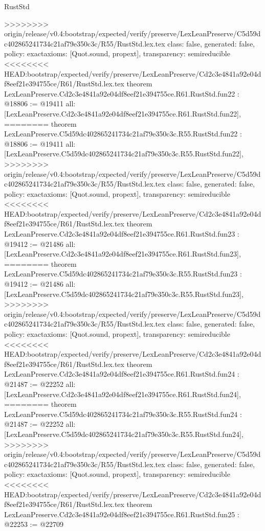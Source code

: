 \begin{lexlean}{RustStd}
\begin{coremodule}
{\begin{coremodule}
{{{{{{{{{{{{{{{{{{{{{{{{{>>>>>>>> origin/release/v0.4:bootstrap/expected/verify/preserve/LexLeanPreserve/C5d59dc402865241734c21af79e350c3c/R55/RustStd.lex.tex
  class: false,
  generated: false,
  policy: exact{axioms: [Quot.sound, propext]},
  transparency: semireducible
}
<<<<<<<< HEAD:bootstrap/expected/verify/preserve/LexLeanPreserve/Cd2c3e4841a92e04df8eef21e394755ce/R61/RustStd.lex.tex
theorem LexLeanPreserve.Cd2c3e4841a92e04df8eef21e394755ce.R61.RustStd.fun22 : @18806 := @19411 {
  all: [LexLeanPreserve.Cd2c3e4841a92e04df8eef21e394755ce.R61.RustStd.fun22],
========
theorem LexLeanPreserve.C5d59dc402865241734c21af79e350c3c.R55.RustStd.fun22 : @18806 := @19411 {
  all: [LexLeanPreserve.C5d59dc402865241734c21af79e350c3c.R55.RustStd.fun22],
>>>>>>>> origin/release/v0.4:bootstrap/expected/verify/preserve/LexLeanPreserve/C5d59dc402865241734c21af79e350c3c/R55/RustStd.lex.tex
  class: false,
  generated: false,
  policy: exact{axioms: [Quot.sound, propext]},
  transparency: semireducible
}
<<<<<<<< HEAD:bootstrap/expected/verify/preserve/LexLeanPreserve/Cd2c3e4841a92e04df8eef21e394755ce/R61/RustStd.lex.tex
theorem LexLeanPreserve.Cd2c3e4841a92e04df8eef21e394755ce.R61.RustStd.fun23 : @19412 := @21486 {
  all: [LexLeanPreserve.Cd2c3e4841a92e04df8eef21e394755ce.R61.RustStd.fun23],
========
theorem LexLeanPreserve.C5d59dc402865241734c21af79e350c3c.R55.RustStd.fun23 : @19412 := @21486 {
  all: [LexLeanPreserve.C5d59dc402865241734c21af79e350c3c.R55.RustStd.fun23],
>>>>>>>> origin/release/v0.4:bootstrap/expected/verify/preserve/LexLeanPreserve/C5d59dc402865241734c21af79e350c3c/R55/RustStd.lex.tex
  class: false,
  generated: false,
  policy: exact{axioms: [Quot.sound, propext]},
  transparency: semireducible
}
<<<<<<<< HEAD:bootstrap/expected/verify/preserve/LexLeanPreserve/Cd2c3e4841a92e04df8eef21e394755ce/R61/RustStd.lex.tex
theorem LexLeanPreserve.Cd2c3e4841a92e04df8eef21e394755ce.R61.RustStd.fun24 : @21487 := @22252 {
  all: [LexLeanPreserve.Cd2c3e4841a92e04df8eef21e394755ce.R61.RustStd.fun24],
========
theorem LexLeanPreserve.C5d59dc402865241734c21af79e350c3c.R55.RustStd.fun24 : @21487 := @22252 {
  all: [LexLeanPreserve.C5d59dc402865241734c21af79e350c3c.R55.RustStd.fun24],
>>>>>>>> origin/release/v0.4:bootstrap/expected/verify/preserve/LexLeanPreserve/C5d59dc402865241734c21af79e350c3c/R55/RustStd.lex.tex
  class: false,
  generated: false,
  policy: exact{axioms: [Quot.sound, propext]},
  transparency: semireducible
}
<<<<<<<< HEAD:bootstrap/expected/verify/preserve/LexLeanPreserve/Cd2c3e4841a92e04df8eef21e394755ce/R61/RustStd.lex.tex
theorem LexLeanPreserve.Cd2c3e4841a92e04df8eef21e394755ce.R61.RustStd.fun25 : @22253 := @22709 {
}}}}}}}}}}}}}}}}}}}}}}}}}}}}
\end{coremodule}}
\end{coremodule}
\end{lexlean}
